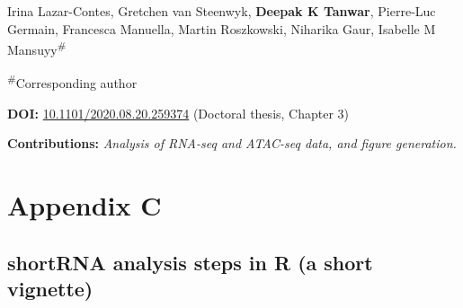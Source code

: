 \documentclass[12pt,twoside]{reedthesis}
\begin{document}
Irina Lazar-Contes, Gretchen van Steenwyk, \textbf{Deepak K Tanwar}, Pierre-Luc Germain, Francesca Manuella, Martin Roszkowski, Niharika Gaur, Isabelle M Mansuyy\textsuperscript{\#}

\textsuperscript{\#}Corresponding author \newline 

\textbf{DOI:} \href{https://doi.org/10.1101/2020.08.20.259374}{10.1101/2020.08.20.259374} (Doctoral thesis, Chapter 3)\newline 

\textbf{Contributions:} \emph{Analysis of RNA-seq and ATAC-seq data, and figure generation.}

\hypertarget{ac}{%
\chapter*{Appendix C}\label{ac}}


\noindent

\setlength\parindent{0pt}

\hypertarget{shortrna-analysis-steps-in-r-a-short-vignette}{%
\section*{shortRNA analysis steps in R (a short vignette)}\label{shortrna-analysis-steps-in-r-a-short-vignette}}
\end{document}
